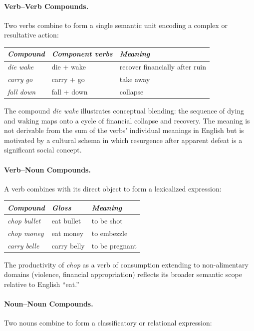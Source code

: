 \documentclass[12pt]{article}
\begin{document}
\paragraph{Verb--Verb Compounds.}
Two verbs combine to form a single semantic unit encoding a complex or resultative action:

\begin{center}
\begin{tabular}{lll}
\textit{Compound} & \textit{Component verbs} & \textit{Meaning} \\
\hline
\textit{die wake} & die + wake & recover financially after ruin \\
\textit{carry go} & carry + go & take away \\
\textit{fall down} & fall + down & collapse \\
\end{tabular}
\end{center}

The compound \textit{die wake} illustrates conceptual blending: the sequence of dying and waking maps onto a cycle of financial collapse and recovery. The meaning is not derivable from the sum of the verbs' individual meanings in English but is motivated by a cultural schema in which resurgence after apparent defeat is a significant social concept.

\paragraph{Verb--Noun Compounds.}
A verb combines with its direct object to form a lexicalized expression:

\begin{center}
\begin{tabular}{lll}
\textit{Compound} & \textit{Gloss} & \textit{Meaning} \\
\hline
\textit{chop bullet} & eat bullet & to be shot \\
\textit{chop money} & eat money & to embezzle \\
\textit{carry belle} & carry belly & to be pregnant \\
\end{tabular}
\end{center}

The productivity of \textit{chop} as a verb of consumption extending to non-alimentary domains (violence, financial appropriation) reflects its broader semantic scope relative to English ``eat.''

\paragraph{Noun--Noun Compounds.}
Two nouns combine to form a classificatory or relational expression:
\end{document}
